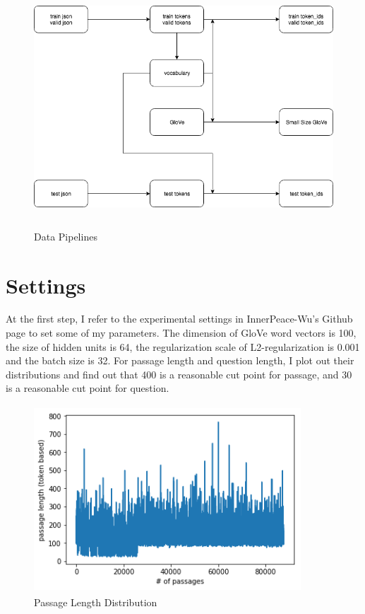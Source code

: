 \documentclass[modernstyle,12pt]{sjsuthesis}
\theoremstyle{definition}
\begin{document}
\begin{figure}[htbp]\centering
  \includegraphics[width=12cm, height=9cm]{figures/data.png}
  \caption{Data Pipelines}
  \label{f:data}
\end{figure}

\section{Settings}
At the first step, I refer to the experimental settings in InnerPeace-Wu's Github page to set some of my parameters. The dimension of GloVe word vectors is 100, the size of hidden units is 64, the regularization scale of L2-regularization is 0.001 and the batch size is 32. For passage length and question length, I plot out their distributions and find out that 400 is a reasonable cut point for passage, and 30 is a reasonable cut point for question.


\begin{figure}[htbp]\centering
  \includegraphics[width=10cm, height=7cm]{figures/passage_length.png}
  \caption{Passage Length Distribution}
  \label{f:passage_length}
\end{figure}
\end{document}
